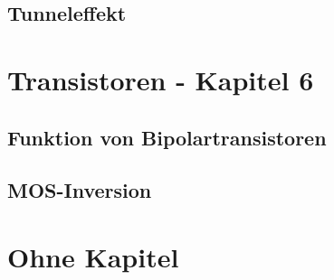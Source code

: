 \documentclass{article}
\begin{document}
\subsection{Tunneleffekt}\label{k5:tunnelEffekt}

\section{Transistoren - Kapitel 6}
\subsection{Funktion von Bipolartransistoren}\label{k6:bipolar}
\subsection{MOS-Inversion}\label{k6:mosInversion}

\section{Ohne Kapitel}
\end{document}
